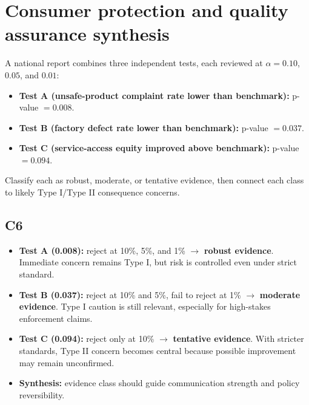 	\section{Consumer protection and quality assurance synthesis}
	A national report combines three independent tests, each reviewed at \(\alpha=0.10\), \(0.05\), and \(0.01\):
	\begin{itemize}
		\item \textbf{Test A (unsafe-product complaint rate lower than benchmark):} p-value \(=0.008\).
		\item \textbf{Test B (factory defect rate lower than benchmark):} p-value \(=0.037\).
		\item \textbf{Test C (service-access equity improved above benchmark):} p-value \(=0.094\).
	\end{itemize}
	Classify each as robust, moderate, or tentative evidence, then connect each class to likely Type I/Type II consequence concerns.
	
	\begin{center}
		\hspace{0.5cm}
		\hspace{0.5cm}
	\end{center}
	
	\subsection*{C6}
	\begin{itemize}
		\item \textbf{Test A (0.008):} reject at 10\%, 5\%, and 1\% $\rightarrow$ \textbf{robust evidence}. Immediate concern remains Type I, but risk is controlled even under strict standard.
		\item \textbf{Test B (0.037):} reject at 10\% and 5\%, fail to reject at 1\% $\rightarrow$ \textbf{moderate evidence}. Type I caution is still relevant, especially for high-stakes enforcement claims.
		\item \textbf{Test C (0.094):} reject only at 10\% $\rightarrow$ \textbf{tentative evidence}. With stricter standards, Type II concern becomes central because possible improvement may remain unconfirmed.
		\item \textbf{Synthesis:} evidence class should guide communication strength and policy reversibility.
	\end{itemize}
	
